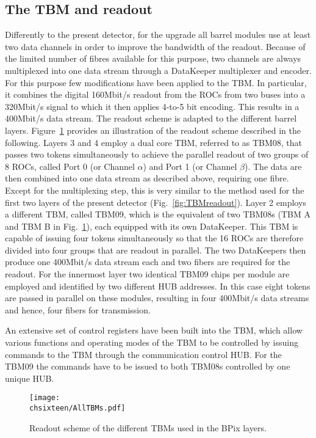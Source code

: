\subsection{The TBM and readout}\label{subsec:Phase1TBM}

Differently to the present detector, for the upgrade all barrel modules use at least two data channels in order to improve the bandwidth of the readout.
Because of the limited number of fibres available for this purpose, two channels are always multiplexed into one data stream through a DataKeeper multiplexer and encoder.
For this purpose few modifications have been applied to the TBM.
In particular, it combines the digital 160\unit{Mbit/s} readout from the ROCs from two buses into a 320\unit{Mbit/s} signal to which it then applies 4-to-5 bit encoding. This results in a 400\unit{Mbit/s} data stream.
The readout scheme is adapted to the different barrel layers.
Figure~\ref{fig:Phase1TBMRO} provides an illustration of the readout scheme described in the following.
Layers 3 and 4 employ a dual core TBM, referred to as TBM08, that passes two tokens simultaneously to achieve the parallel readout of two groups of 8 ROCs, called Port 0 (or Channel $\alpha$) and Port 1 (or Channel $\beta$). 
The data are then combined into one data stream as described above, requiring one fibre. Except for the multiplexing step, this is very similar to the method used for the first two layers of the present detector (Fig.~\ref{fig:TBMreadout}).
Layer 2 employs a different TBM, called TBM09, which is the equivalent of two TBM08s (TBM A and TBM B in Fig.~\ref{fig:Phase1TBMRO}), each equipped with its own DataKeeper. This TBM is capable of issuing four tokens simultaneously so that the 16 ROCs are therefore divided into four groups that are readout in parallel. The two DataKeepers then produce one 400\unit{Mbit/s} data stream each and two fibers are required for the readout.
For the innermost layer two identical TBM09 chips per module are employed and identified by two different HUB addresses. In this case eight tokens are passed in parallel on these modules, resulting in four 400\unit{Mbit/s} data streams and hence, four fibers for transmission.

An extensive set of control registers have been built into the TBM, which allow various functions and operating modes of the TBM to be controlled by issuing commands to the TBM through the communication control HUB.
For the TBM09 the commands have to be issued to both TBM08s controlled by one unique HUB.

\begin{figure}[!htb]
 \begin{center}
 \texttt{[image: \\chsixteen/AllTBMs.pdf]}
 \end{center}
 \caption{Readout scheme of the different TBMs used in the BPix layers.}
 \label{fig:Phase1TBMRO}
\end{figure}

